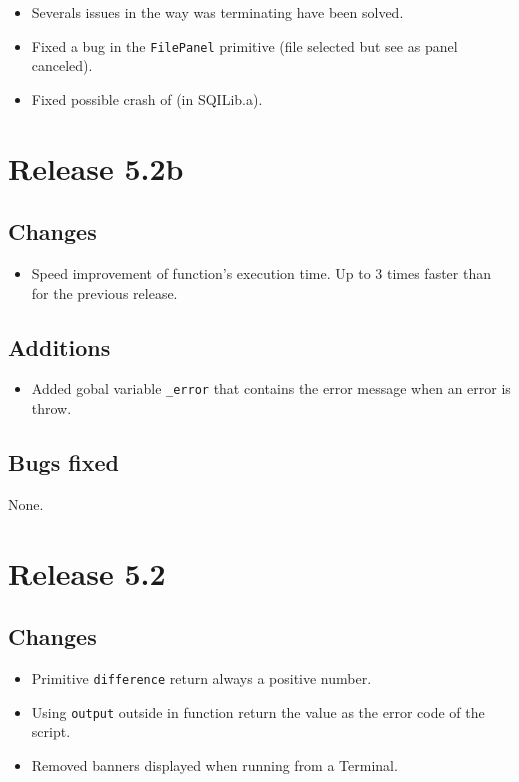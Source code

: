 \begin{itemize}
\item Severals issues in the way \squirrel was terminating have been solved.
\item Fixed a bug in the {\tt FilePanel} primitive (file selected but see as panel canceled).
\item Fixed possible crash of \squirrel (in SQILib.a).
\end{itemize}

\section{Release 5.2b}

\subsection{Changes}

\begin{itemize}
\item Speed improvement of function's execution time. Up to 3 times faster than for the previous release.
\end{itemize}

\subsection{Additions}

\begin{itemize}
\item Added gobal variable {\tt \_error} that contains the error message when
an error is throw.
\end{itemize}

\subsection{Bugs fixed}

None.

\section{Release 5.2}

\subsection{Changes}

\begin{itemize}
\item Primitive {\tt difference} return always a positive number.
\item Using {\tt output} outside in function return the value as the error code
of the script.
\item Removed \squirrel banners displayed when running \squirrel from a Terminal.
\end{itemize}


